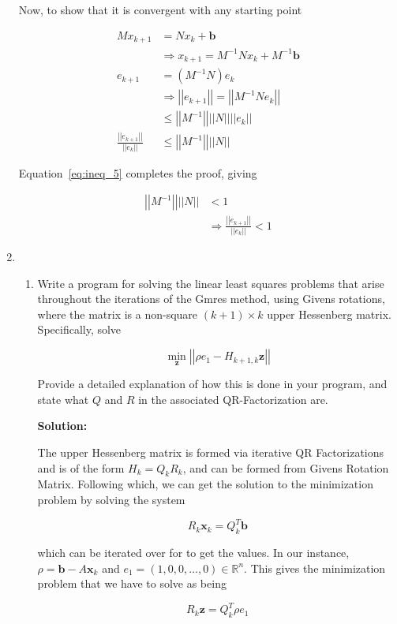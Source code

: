 \documentclass[12pt]{article}
\newcommand{\norm}[1]{\left|\left| #1 \right|\right|}
\newcommand{\vect}{\mathbf}
\newcommand{\inv}[1]{ #1^{-1}}
\renewcommand{\P}[1]{\left( #1 \right)}
\begin{document}
\begin{enumerate}
Now, to show that it is convergent with any starting point

\begin{align*}
  Mx_{k+1} &= Nx_{k} + \vect{b}\\
  &\Rightarrow x_{k+1} = \inv{M}Nx_{k} + \inv{M}\vect{b}\\
  e_{k+1} &= \P{\inv{M}N}e_{k}\\
  &\Rightarrow \norm{e_{k+1}} = \norm{\inv{M}Ne_{k}}\\
  &\leq \norm{\inv{M}}\norm{N}\norm{e_{k}}\\
  \frac{\norm{e_{k+1}}}{\norm{e_{k}}} &\leq \norm{\inv{M}} \norm{N}
\end{align*}

Equation~\ref{eq:ineq_5} completes the proof, giving

\begin{align*}
  \norm{\inv{M}} \norm{N} &< 1\\
  &\Rightarrow \frac{\norm{e_{k+1}}}{\norm{e_{k}}} < 1
\end{align*}

\item \
\begin{enumerate}
\item Write a program for solving the linear least squares problems that arise
throughout the iterations of the {\sc Gmres} method, using Givens rotations,
where the matrix is a non-square $(k+1) \times k$ upper Hessenberg matrix. Specifically,
solve

\[
\min_{\vect{z}} \norm{\rho e_{1} - H_{k+1,k}\mathbf{z}}
\]

Provide a detailed explanation of how this is done in your program, and state
what $Q$ and $R$ in the associated QR-Factorization are.

{\bf Solution:}

The upper Hessenberg matrix is formed via iterative QR Factorizations and is
of the form $H_{k} = Q_{k} R_{k}$, and can be formed from Givens Rotation Matrix.
Following which, we can get the solution to the minimization problem by solving
the system

\[
    R_{k} \vect{x}_{k} = Q_{k}^{T}\vect{b}
\]

which can be iterated over for to get the values. In our instance, $\rho = \vect{b} - A\vect{x}_{k}$
and $e_{1} = \left(1, 0, 0, \ldots, 0 \right)\in \mathbb{R}^{n}$. This gives the minimization problem
that we have to solve as being

\[
    R_{k}\vect{z} = Q_{k}^{T}\rho e_{1}
\]


\end{enumerate}
\end{enumerate}
\end{document}
